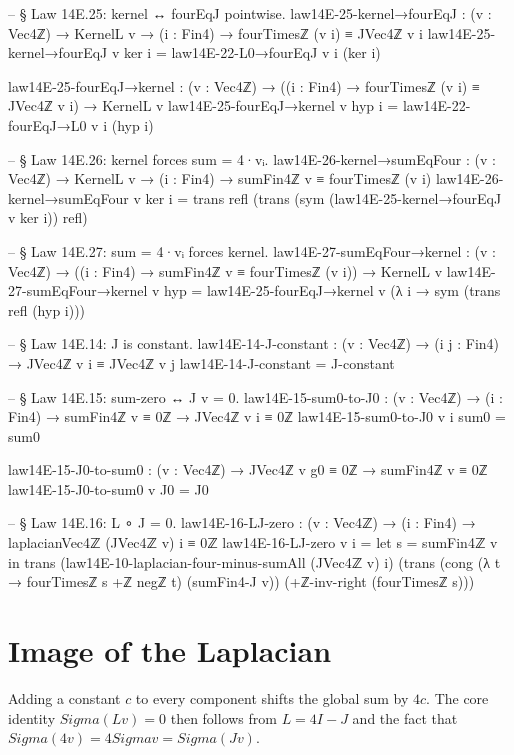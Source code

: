 \documentclass[11pt,a4paper]{book}
\def\Sigma{Sigma}%
\begin{document}
\begin{code}
-- § Law 14E.25: kernel ↔ fourEqJ pointwise.
law14E-25-kernel→fourEqJ : (v : Vec4ℤ) → KernelL v → (i : Fin4) →
  fourTimesℤ (v i) ≡ JVec4ℤ v i
law14E-25-kernel→fourEqJ v ker i = law14E-22-L0→fourEqJ v i (ker i)

law14E-25-fourEqJ→kernel : (v : Vec4ℤ) → ((i : Fin4) → fourTimesℤ (v i) ≡ JVec4ℤ v i) → KernelL v
law14E-25-fourEqJ→kernel v hyp i = law14E-22-fourEqJ→L0 v i (hyp i)

-- § Law 14E.26: kernel forces sum = 4·vᵢ.
law14E-26-kernel→sumEqFour : (v : Vec4ℤ) → KernelL v → (i : Fin4) →
  sumFin4ℤ v ≡ fourTimesℤ (v i)
law14E-26-kernel→sumEqFour v ker i =
  trans
    refl
    (trans
      (sym (law14E-25-kernel→fourEqJ v ker i))
      refl)

-- § Law 14E.27: sum = 4·vᵢ forces kernel.
law14E-27-sumEqFour→kernel : (v : Vec4ℤ) → ((i : Fin4) → sumFin4ℤ v ≡ fourTimesℤ (v i)) → KernelL v
law14E-27-sumEqFour→kernel v hyp =
  law14E-25-fourEqJ→kernel v (λ i → sym (trans refl (hyp i)))

-- § Law 14E.14: J is constant.
law14E-14-J-constant : (v : Vec4ℤ) → (i j : Fin4) →
  JVec4ℤ v i ≡ JVec4ℤ v j
law14E-14-J-constant = J-constant

-- § Law 14E.15: sum-zero ↔ J v = 0.
law14E-15-sum0-to-J0 : (v : Vec4ℤ) → (i : Fin4) → sumFin4ℤ v ≡ 0ℤ →
  JVec4ℤ v i ≡ 0ℤ
law14E-15-sum0-to-J0 v i sum0 = sum0

law14E-15-J0-to-sum0 : (v : Vec4ℤ) → JVec4ℤ v g0 ≡ 0ℤ →
  sumFin4ℤ v ≡ 0ℤ
law14E-15-J0-to-sum0 v J0 = J0

-- § Law 14E.16: L ∘ J = 0.
law14E-16-LJ-zero : (v : Vec4ℤ) → (i : Fin4) →
  laplacianVec4ℤ (JVec4ℤ v) i ≡ 0ℤ
law14E-16-LJ-zero v i =
  let s = sumFin4ℤ v in
  trans
    (law14E-10-laplacian-four-minus-sumAll (JVec4ℤ v) i)
    (trans
      (cong (λ t → fourTimesℤ s +ℤ negℤ t) (sumFin4-J v))
      (+ℤ-inv-right (fourTimesℤ s)))
\end{code}

\section{Image of the Laplacian}

Adding a constant $c$ to every component shifts the global sum by $4c$.
The core identity $\Sigma(L v) = 0$ then follows from $L = 4I - J$ and the fact that $\Sigma(4v) = 4 \Sigma v = \Sigma(Jv)$.
\end{document}
